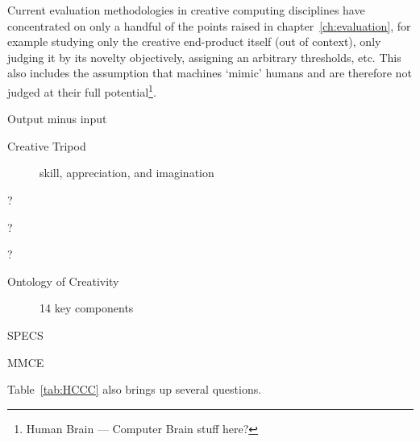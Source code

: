 
Current evaluation methodologies in creative computing disciplines have concentrated on only a handful of the points raised in chapter~\ref{ch:evaluation}, for example studying only the creative end-product itself (out of context), only judging it by its novelty objectively, assigning an arbitrary thresholds, etc. This also includes the assumption that machines `mimic' humans and are therefore not judged at their full potential\footnote{Human Brain --- Computer Brain stuff here?}.

\begin{description}
  \item [Output minus input] \autocite[p.2]{Pease2001}
  \item [Creative Tripod] skill, appreciation, and imagination \autocite{Colton2008a, Colton2008}
  \item [?] \autocite{Ritchie2007, Ritchie2001}
  \item [?] \autocite{Ventura2008}
  \item [?] \autocite{Pease2013}
  \item [Ontology of Creativity] 14 key components \autocite{Jordanous2012}
  \item [SPECS] \autocite{Jordanous2012a}
  \item [MMCE] \autocite{Candy2012}
\end{description}




\spirals

Table~\ref{tab:HCCC} also brings up several questions.

